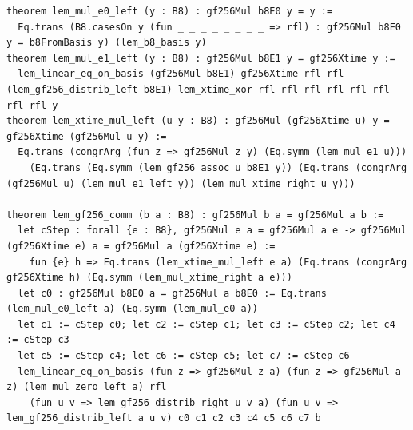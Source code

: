 \documentclass[11pt,letterpaper]{article}
\theoremstyle{spectralthm}
\begin{document}
\begin{lstlisting}[language=Lean4,caption={Standalone Pure Init.Prelude Term-Mode Lean 4 Kernel Suite (thm30--thm61, v0.0.0, 0 sorry, 0 axioms).},label={lst:lean_unified}]
theorem lem_mul_e0_left (y : B8) : gf256Mul b8E0 y = y :=
  Eq.trans (B8.casesOn y (fun _ _ _ _ _ _ _ _ => rfl) : gf256Mul b8E0 y = b8FromBasis y) (lem_b8_basis y)
theorem lem_mul_e1_left (y : B8) : gf256Mul b8E1 y = gf256Xtime y :=
  lem_linear_eq_on_basis (gf256Mul b8E1) gf256Xtime rfl rfl (lem_gf256_distrib_left b8E1) lem_xtime_xor rfl rfl rfl rfl rfl rfl rfl rfl y
theorem lem_xtime_mul_left (u y : B8) : gf256Mul (gf256Xtime u) y = gf256Xtime (gf256Mul u y) :=
  Eq.trans (congrArg (fun z => gf256Mul z y) (Eq.symm (lem_mul_e1 u)))
    (Eq.trans (Eq.symm (lem_gf256_assoc u b8E1 y)) (Eq.trans (congrArg (gf256Mul u) (lem_mul_e1_left y)) (lem_mul_xtime_right u y)))

theorem lem_gf256_comm (b a : B8) : gf256Mul b a = gf256Mul a b :=
  let cStep : forall {e : B8}, gf256Mul e a = gf256Mul a e -> gf256Mul (gf256Xtime e) a = gf256Mul a (gf256Xtime e) :=
    fun {e} h => Eq.trans (lem_xtime_mul_left e a) (Eq.trans (congrArg gf256Xtime h) (Eq.symm (lem_mul_xtime_right a e)))
  let c0 : gf256Mul b8E0 a = gf256Mul a b8E0 := Eq.trans (lem_mul_e0_left a) (Eq.symm (lem_mul_e0 a))
  let c1 := cStep c0; let c2 := cStep c1; let c3 := cStep c2; let c4 := cStep c3
  let c5 := cStep c4; let c6 := cStep c5; let c7 := cStep c6
  lem_linear_eq_on_basis (fun z => gf256Mul z a) (fun z => gf256Mul a z) (lem_mul_zero_left a) rfl
    (fun u v => lem_gf256_distrib_right u v a) (fun u v => lem_gf256_distrib_left a u v) c0 c1 c2 c3 c4 c5 c6 c7 b


\end{lstlisting}
\end{document}
